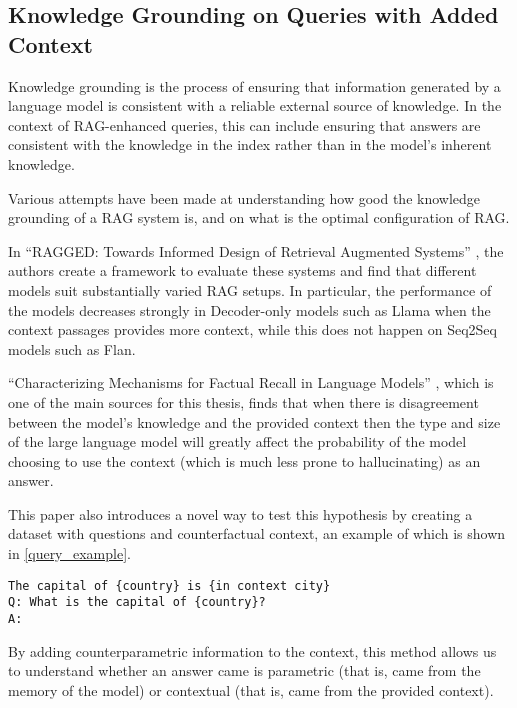 \subsection{Knowledge Grounding on Queries with Added Context}

Knowledge grounding is the process of ensuring that information generated by a language model is consistent with a reliable external source of knowledge.
In the context of RAG-enhanced queries, this can include ensuring that answers are consistent with the knowledge in the index rather than in the model's inherent knowledge.

Various attempts have been made at understanding how good the knowledge grounding of a RAG system is, and on what is the optimal configuration of RAG.

In ``RAGGED: Towards Informed Design of Retrieval Augmented Systems'' \citep{ragged}, the authors create a framework to evaluate these systems and find that different models suit substantially varied RAG setups.
In particular, the performance of the models decreases strongly in Decoder-only models such as Llama when the context passages provides more context, while this does not happen on Seq2Seq models such as Flan.

``Characterizing Mechanisms for Factual Recall in Language Models'' \citep{factual_recall}, which is one of the main sources for this thesis, finds that when there is disagreement between the model's knowledge and the provided context then the type and size of the large language model will greatly affect the probability of the model choosing to use the context (which is much less prone to hallucinating) as an answer.

This paper also introduces a novel way to test this hypothesis by creating a dataset with questions and counterfactual context, an example of which is shown in \cref{query_example}.

\begin{lstlisting}[caption={Example of queries used in \citep{factual_recall}. These queries form the basis and inspiration for the dataset creation done in this thesis}, label={query_example},basicstyle=\ttfamily\small,keywordstyle=\rmfamily\bfseries,keywords={country,in,context,city},captionpos=b,frame=single,breaklines=true,xrightmargin=.15\textwidth,xleftmargin=.15\textwidth,float=h]
The capital of {country} is {in context city}
Q: What is the capital of {country}?
A:
\end{lstlisting}

By adding counterparametric information to the context, this method allows us to understand whether an answer came is parametric (that is, came from the memory of the model) or contextual (that is, came from the provided context).
